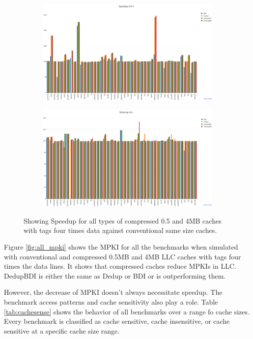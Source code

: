 \begin{figure}
    \begin{subfigure}{\textwidth}
        \includegraphics[width=\textwidth]{all05-speedup.png}
    \end{subfigure}
    \begin{subfigure}{\textwidth}
        \includegraphics[width=\textwidth]{all4-speedup.png}
    \end{subfigure}
    \caption[All benchmarks: Speedup]{Showing Speedup for all types of compressed 0.5 and 4MB caches with tags four times data against conventional same size caches.}
    \label{fig:all_speedup}
\end{figure}
Figure \ref{fig:all_mpki} shows the MPKI for all the benchmarks when simulated with conventional and compressed 0.5MB and 4MB LLC caches with tags four times the data lines. It shows that compressed caches reduce MPKIs in LLC. DedupBDI is either the same as Dedup or BDI or is outperforming them.\par
However, the decrease of MPKI doesn't always necessitate speedup. The benchmark access patterns and cache sensitivity also play a role. Table \ref{tab:cachesense} shows the behavior of all benchmarks over a range fo cache sizes. Every benchmark is classified as cache sensitive, cache insensitive, or cache sensitive at a specific cache size range.
